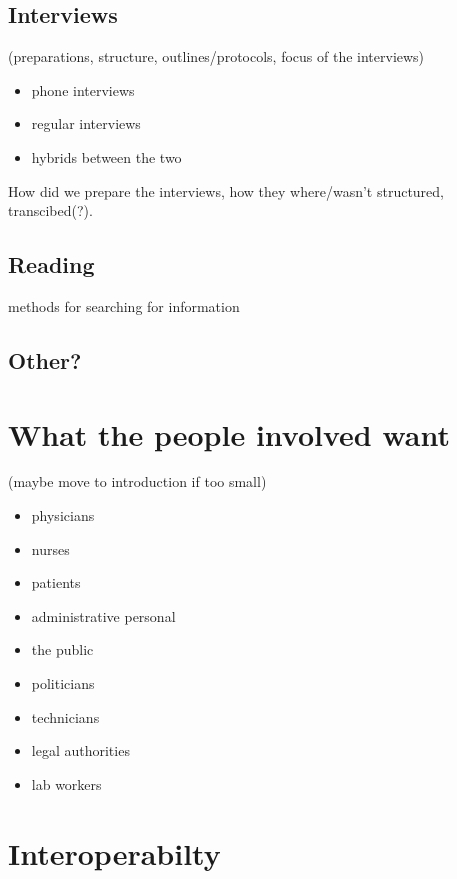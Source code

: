 \documentclass[12pt]{article}
\begin{document}
\subsection{Interviews}
(preparations, structure, outlines/protocols, focus of the interviews)
\begin{itemize}
\item phone interviews
\item regular interviews
\item hybrids between the two
\end{itemize}

How did we prepare the interviews, how they where/wasn't structured, transcibed(?).

\subsection{Reading}
methods for searching for information

\subsection{Other?}

\section{What the people involved want}
(maybe move to introduction if too small)
\begin{itemize}
\item physicians
\item nurses
\item patients
\item administrative personal
\item the public
\item politicians
\item technicians
\item legal authorities
\item lab workers
\end{itemize}


\section{Interoperabilty}
\end{document}
